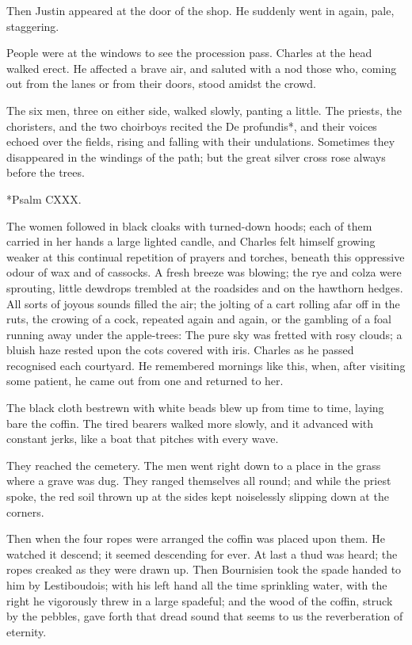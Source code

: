 \documentclass[11pt,twocolumn]{ltugboat}
\begin{document}
Then Justin appeared at the door of the shop. He suddenly went in again,
pale, staggering.

People were at the windows to see the procession pass. Charles at the
head walked erect. He affected a brave air, and saluted with a nod those
who, coming out from the lanes or from their doors, stood amidst the
crowd.

The six men, three on either side, walked slowly, panting a little.
The priests, the choristers, and the two choirboys recited the De
profundis*, and their voices echoed over the fields, rising and falling
with their undulations. Sometimes they disappeared in the windings of
the path; but the great silver cross rose always before the trees.

     *Psalm CXXX.


The women followed in black cloaks with turned-down hoods; each of them
carried in her hands a large lighted candle, and Charles felt himself
growing weaker at this continual repetition of prayers and torches,
beneath this oppressive odour of wax and of cassocks. A fresh breeze was
blowing; the rye and colza were sprouting, little dewdrops trembled at
the roadsides and on the hawthorn hedges. All sorts of joyous sounds
filled the air; the jolting of a cart rolling afar off in the ruts, the
crowing of a cock, repeated again and again, or the gambling of a foal
running away under the apple-trees: The pure sky was fretted with rosy
clouds; a bluish haze rested upon the cots covered with iris. Charles as
he passed recognised each courtyard. He remembered mornings like this,
when, after visiting some patient, he came out from one and returned to
her.

The black cloth bestrewn with white beads blew up from time to time,
laying bare the coffin. The tired bearers walked more slowly, and it
advanced with constant jerks, like a boat that pitches with every wave.

They reached the cemetery. The men went right down to a place in the
grass where a grave was dug. They ranged themselves all round; and while
the priest spoke, the red soil thrown up at the sides kept noiselessly
slipping down at the corners.

Then when the four ropes were arranged the coffin was placed upon them.
He watched it descend; it seemed descending for ever. At last a thud was
heard; the ropes creaked as they were drawn up. Then Bournisien took
the spade handed to him by Lestiboudois; with his left hand all the
time sprinkling water, with the right he vigorously threw in a large
spadeful; and the wood of the coffin, struck by the pebbles, gave forth
that dread sound that seems to us the reverberation of eternity.
\end{document}
